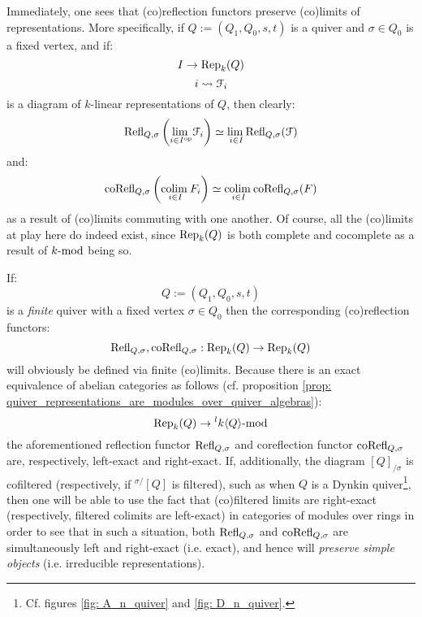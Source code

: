             \begin{remark} \label{remark: categorical_properties_of_(co)reflection_functors}
                Immediately, one sees that (co)reflection functors preserve (co)limits of representations. More specifically, if $Q := (Q_1, Q_0, s, t)$ is a quiver and $\sigma \in Q_0$ is a fixed vertex, and if:
                    $$I \to \Rep_k(Q)$$
                    $$i \mapsto \calF_i$$
                is a diagram of $k$-linear representations of $Q$, then clearly:
                    $$\Refl_{Q, \sigma}\left( \underset{i \in I^{\op}}{\lim} \calF_i \right) \cong \underset{i \in I}{\lim} \Refl_{Q, \sigma}(\calF)$$
                and:
                    $$\co\Refl_{Q, \sigma}\left( \underset{i \in I}{\colim} F_i \right) \cong \underset{i \in I}{\colim} \co\Refl_{Q, \sigma}(F)$$
                as a result of (co)limits commuting with one another. Of course, all the (co)limits at play here do indeed exist, since $\Rep_k(Q)$ is both complete and cocomplete as a result of $k\mod$ being so.
            \end{remark}
            \begin{remark} \label{remark: (co)reflection_functors_of_finite_quivers_are_exact}
                If:
                    $$Q := (Q_1, Q_0, s, t)$$
                is a \textit{finite} quiver with a fixed vertex $\sigma \in Q_0$ then the corresponding (co)reflection functors:
                    $$\Refl_{Q, \sigma}, \co\Refl_{Q, \sigma}: \Rep_k(Q) \to \Rep_k(Q)$$
                will obviously be defined via finite (co)limits. Because there is an exact equivalence of abelian categories as follows (cf. proposition \ref{prop: quiver_representations_are_modules_over_quiver_algebras}):
                    $$\Rep_k(Q) \to {}^lk\<Q\>\mod$$
                the aforementioned reflection functor $\Refl_{Q, \sigma}$ and coreflection functor $\co\Refl_{Q, \sigma}$ are, respectively, left-exact and right-exact. If, additionally, the diagram $[Q]_{/\sigma}$ is cofiltered (respectively, if ${}^{\sigma/}[Q]$ is filtered), such as when $Q$ is a Dynkin quiver\footnote{Cf. figures \ref{fig: A_n_quiver} and \ref{fig: D_n_quiver}.}, then one will be able to use the fact that (co)filtered limits are right-exact (respectively, filtered colimits are left-exact) in categories of modules over rings in order to see that in such a situation, both $\Refl_{Q, \sigma}$ and $\co\Refl_{Q, \sigma}$ are simultaneously left and right-exact (i.e. exact), and hence will \textit{preserve simple objects} (i.e. irreducible representations).
            \end{remark}
                
